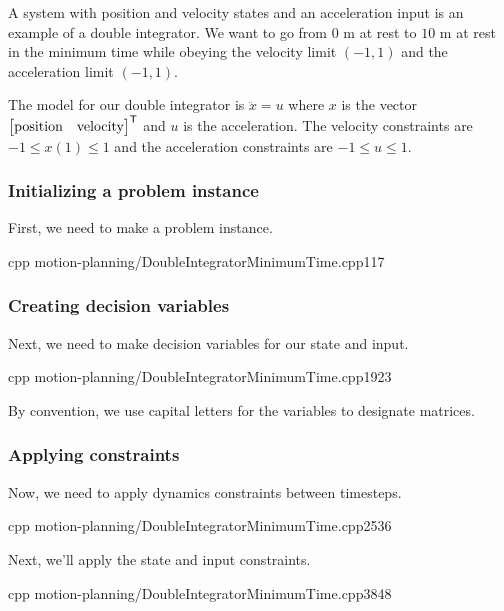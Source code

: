 A system with position and velocity states and an acceleration input is an
example of a double integrator. We want to go from $0$ m at rest to $10$ m at
rest in the minimum time while obeying the velocity limit $(-1, 1)$ and the
acceleration limit $(-1, 1)$.

The model for our double integrator is $\ddot{x} = u$ where $x$ is the vector
$\begin{bmatrix}\text{position} & \text{velocity}\end{bmatrix}^\mathsf{T}$ and $u$ is the
acceleration. The velocity constraints are $-1 \leq x(1) \leq 1$ and the
acceleration constraints are $-1 \leq u \leq 1$.

\subsubsection{Initializing a problem instance}

First, we need to make a problem instance.
\begin{coderemotesubset}{cpp}
  {motion-planning/DoubleIntegratorMinimumTime.cpp}{1}{17}
\end{coderemotesubset}

\subsubsection{Creating decision variables}

Next, we need to make decision variables for our state and input.
\begin{coderemotesubset}{cpp}
  {motion-planning/DoubleIntegratorMinimumTime.cpp}{19}{23}
\end{coderemotesubset}

By convention, we use capital letters for the variables to designate
matrices.

\subsubsection{Applying constraints}

Now, we need to apply dynamics constraints between timesteps.
\begin{coderemotesubset}{cpp}
  {motion-planning/DoubleIntegratorMinimumTime.cpp}{25}{36}
\end{coderemotesubset}

Next, we'll apply the state and input constraints.
\begin{coderemotesubset}{cpp}
  {motion-planning/DoubleIntegratorMinimumTime.cpp}{38}{48}
\end{coderemotesubset}

